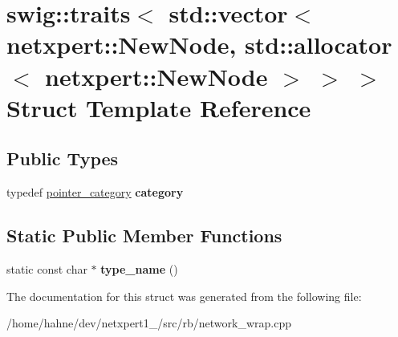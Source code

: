 \hypertarget{structswig_1_1traits_3_01std_1_1vector_3_01netxpert_1_1NewNode_00_01std_1_1allocator_3_01netxpert_1_1NewNode_01_4_01_4_01_4}{}\section{swig\+:\+:traits$<$ std\+:\+:vector$<$ netxpert\+:\+:New\+Node, std\+:\+:allocator$<$ netxpert\+:\+:New\+Node $>$ $>$ $>$ Struct Template Reference}
\label{structswig_1_1traits_3_01std_1_1vector_3_01netxpert_1_1NewNode_00_01std_1_1allocator_3_01netxpert_1_1NewNode_01_4_01_4_01_4}
\subsection*{Public Types}
\begin{DoxyCompactItemize}
\item 
typedef \hyperlink{structswig_1_1pointer__category}{pointer\+\_\+category} {\bfseries category}\hypertarget{structswig_1_1traits_3_01std_1_1vector_3_01netxpert_1_1NewNode_00_01std_1_1allocator_3_01netxpert_1_1NewNode_01_4_01_4_01_4_ab267ac482a025753b7c8d8f15d6b7b9b}{}\label{structswig_1_1traits_3_01std_1_1vector_3_01netxpert_1_1NewNode_00_01std_1_1allocator_3_01netxpert_1_1NewNode_01_4_01_4_01_4_ab267ac482a025753b7c8d8f15d6b7b9b}

\end{DoxyCompactItemize}
\subsection*{Static Public Member Functions}
\begin{DoxyCompactItemize}
\item 
static const char $\ast$ {\bfseries type\+\_\+name} ()\hypertarget{structswig_1_1traits_3_01std_1_1vector_3_01netxpert_1_1NewNode_00_01std_1_1allocator_3_01netxpert_1_1NewNode_01_4_01_4_01_4_a620166ec9ea473406f2087cd6e330c31}{}\label{structswig_1_1traits_3_01std_1_1vector_3_01netxpert_1_1NewNode_00_01std_1_1allocator_3_01netxpert_1_1NewNode_01_4_01_4_01_4_a620166ec9ea473406f2087cd6e330c31}

\end{DoxyCompactItemize}


The documentation for this struct was generated from the following file\+:\begin{DoxyCompactItemize}
\item 
/home/hahne/dev/netxpert1\+\_/src/rb/network\+\_\+wrap.\+cpp\end{DoxyCompactItemize}
